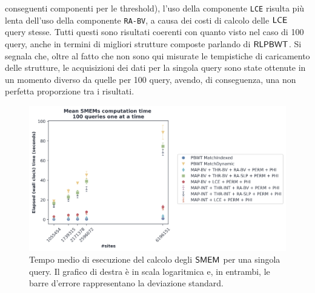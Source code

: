conseguenti componenti per le threshold), l'uso della componente \texttt{LCE}
risulta più lenta dell'uso della componente \texttt{RA-BV}, a causa dei costi di
calcolo delle $\mbox{\rm {\sf LCE}}$ query stesse. Tutti questi sono risultati coerenti
con quanto visto nel caso di 100 query, anche in termini di migliori strutture
composte parlando di $\mbox{\rm {\sf RLPBWT}}$. Si segnala che, oltre al fatto che non
sono qui misurate le tempistiche di caricamento delle strutture, le acquisizioni
dei dati 
per la singola query sono state ottenute in un momento diverso da quelle per 100
query, avendo, di conseguenza, una non perfetta proporzione tra i risultati.
\begin{figure}
  \centering
  \includegraphics[width=\textwidth]{img/exe_time_single_paper.png}
  \caption{Tempo medio di esecuzione del calcolo degli $\mbox{\rm {\sf SMEM}}$ per una singola
    query. Il grafico di destra è in scala logaritmica e, in entrambi, le
    barre d'errore rappresentano la deviazione standard.}
  \label{fig:smemsinglechr}
\end{figure}

